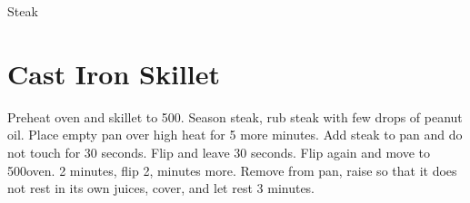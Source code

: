 
\begin{recipe}{Steak}
  \yield{}
  \servings{}
  \oven{500\degF}
  \temperature{135\degF}
  \maketitle

  \section{Cast Iron Skillet}
  Preheat oven and skillet to 500\degF. Season steak, rub steak with few
  drops of peanut oil. Place empty pan over high heat for 5 more minutes.
  Add steak to pan and do not touch for 30 seconds. Flip and leave 30
  seconds. Flip again and move to 500\degF oven. 2 minutes, flip 2, minutes
  more. Remove from pan, raise so that it does not rest in its own juices,
  cover, and let rest 3 minutes.

\end{recipe}


